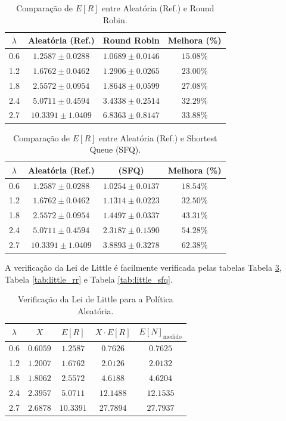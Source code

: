 \documentclass[conference]{IEEEtran}
\begin{document}
\begin{table}[h!]
\centering
\small
\caption{Comparação de $E[R]$ entre Aleatória (Ref.) e Round Robin.}
\label{tab:comp_rr}
\begin{tabular}{cccc}
\toprule
$\lambda$ & \textbf{Aleatória (Ref.)} & \textbf{Round Robin} & \textbf{Melhora (\%)} \\
\midrule
0.6 & $1.2587 \pm 0.0288$ & $1.0689 \pm 0.0146$ & $15.08\%$ \\
1.2 & $1.6762 \pm 0.0462$ & $1.2906 \pm 0.0265$ & $23.00\%$ \\
1.8 & $2.5572 \pm 0.0954$ & $1.8648 \pm 0.0599$ & $27.08\%$ \\
2.4 & $5.0711 \pm 0.4594$ & $3.4338 \pm 0.2514$ & $32.29\%$ \\
2.7 & $10.3391 \pm 1.0409$ & $6.8363 \pm 0.8147$ & $33.88\%$ \\
\bottomrule
\end{tabular}
\end{table}

\begin{table}[h!]
\centering
\small
\caption{Comparação de $E[R]$ entre Aleatória (Ref.) e Shortest Queue (SFQ).}
\label{tab:comp_sfq}
\begin{tabular}{cccc}
\toprule
$\lambda$ & \textbf{Aleatória (Ref.)} & \textbf{(SFQ)} & \textbf{Melhora (\%)} \\
\midrule
0.6 & $1.2587 \pm 0.0288$ & $1.0254 \pm 0.0137$ & $18.54\%$ \\
1.2 & $1.6762 \pm 0.0462$ & $1.1314 \pm 0.0223$ & $32.50\%$ \\
1.8 & $2.5572 \pm 0.0954$ & $1.4497 \pm 0.0337$ & $43.31\%$ \\
2.4 & $5.0711 \pm 0.4594$ & $2.3187 \pm 0.1590$ & $54.28\%$ \\
2.7 & $10.3391 \pm 1.0409$ & $3.8893 \pm 0.3278$ & $62.38\%$ \\
\bottomrule
\end{tabular}
\end{table}

A verificação da Lei de Little é facilmente verificada pelas tabelas Tabela \ref{tab:little_random}, Tabela \ref{tab:little_rr} e Tabela \ref{tab:little_sfq}.

\FloatBarrier
\begin{table}[h!]
\centering
\small
\caption{Verificação da Lei de Little para a Política Aleatória.}
\label{tab:little_random}
\begin{tabular}{ccccc}
\toprule
$\lambda$ & $X$ & $E[R]$ & $X \cdot E[R]$ & $E[N]_{\text{medido}}$ \\
\midrule
0.6 & $0.6059$ & $1.2587$ & $0.7626$ & $0.7625$ \\
1.2 & $1.2007$ & $1.6762$ & $2.0126$ & $2.0132$ \\
1.8 & $1.8062$ & $2.5572$ & $4.6188$ & $4.6204$ \\
2.4 & $2.3957$ & $5.0711$ & $12.1488$ & $12.1535$ \\
2.7 & $2.6878$ & $10.3391$ & $27.7894$ & $27.7937$ \\
\bottomrule
\end{tabular}
\end{table}
\end{document}
